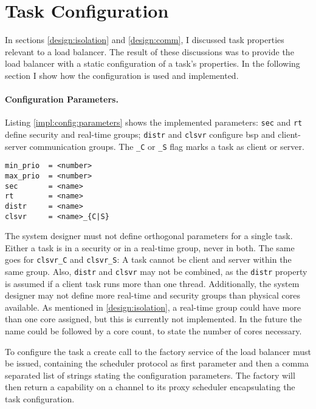 \section{Task Configuration}
\label{impl:config}

In sections \ref{design:isolation} and \ref{design:comm}, I discussed
task properties relevant to a load balancer.
The result of these discussions was to provide the load balancer with a static
configuration of a task's properties.
In the following section I show how the configuration is used and implemented.

\paragraph{Configuration Parameters.}
Listing \ref{impl:config:parameters} shows the implemented parameters:
\texttt{sec} and \texttt{rt} define security and real-time groups;
\texttt{distr} and \texttt{clsvr} configure \gls{bsp} and client-server
communication groups.
The \texttt{\_C} or \texttt{\_S} flag marks a task as client or server.

\begin{lstlisting}[language={[5.2]Lua}, caption={Implemented set of
configuration parameters for priority range, isolation, and communication
groups.},label={impl:config:parameters}]
min_prio  = <number>
max_prio  = <number>
sec       = <name>
rt        = <name>
distr     = <name>
clsvr     = <name>_{C|S}
\end{lstlisting}

The system designer must not define orthogonal parameters for
a single task.
Either a task is in a security or in a real-time group, never in both.
The same goes for \texttt{clsvr\_C} and \texttt{clsvr\_S}:
A task cannot be client and server within the same group.
Also, \texttt{distr} and \texttt{clsvr} may not be combined, as the
\texttt{distr} property is assumed if a client task runs more than one thread.
Additionally, the system designer may not define more real-time and security
groups than physical cores available.
As mentioned in \ref{design:isolation}, a real-time group could have more than
one core assigned, but this is currently not implemented.
In the future the name could be followed by a core count, to state the number
of cores necessary.

To configure the task a create call to the factory service of the load
balancer must be issued, containing the scheduler protocol as first parameter
and then a comma separated list of strings stating the configuration
parameters.
The factory will then return a capability on a channel to its proxy scheduler
encapsulating the task configuration.
\begin{comment}
Listing \ref{impl:config:proxy} shows an example for the described create call.

\begin{lstlisting}[language={[5.2]Lua},caption={Create call to the load
balancer factory containing protocol, priority band, and a client-server
group.},label={impl:config:proxy}]
tmFactory:create(
  L4.Proto.Scheduler,
  "min_prio = 0",
  "max_prio = 5",
  "clsvr = A_S")
\end{lstlisting}
\end{comment}

